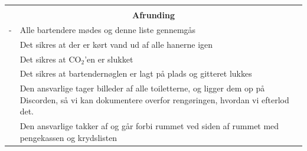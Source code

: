 \documentclass[a4paper,10pt,oneside,article]{memoir}
\begin{document}
\vspace{0.5cm}
\noindent
\begin{tabular}{|l|l|}
    \hline
    \multicolumn{2}{|c|}{} \\
    \multicolumn{2}{|c|}{\Large \textbf{Afrunding}} \\
    \hline
    \begin{minipage}[t]{0.15\textwidth}
        {\color{white}-}
    \end{minipage} & 
    \begin{minipage}[t]{0.80\textwidth}
        Alle bartendere mødes og denne liste gennemgås
    \end{minipage} \\
    \hline
    \begin{minipage}[t]{0.15\textwidth}
    \end{minipage} & 
    \begin{minipage}[t]{0.80\textwidth}
        Det sikres at der er kørt vand ud af alle hanerne igen
    \end{minipage} \\
    \hline
    \begin{minipage}[t]{0.15\textwidth}
    \end{minipage} & 
    \begin{minipage}[t]{0.80\textwidth}
        Det sikres at CO$_2$'en er slukket
    \end{minipage} \\
    \hline
    \begin{minipage}[t]{0.15\textwidth}
    \end{minipage} & 
    \begin{minipage}[t]{0.80\textwidth}
        Det sikres at bartendernøglen er lagt på plads og gitteret lukkes
    \end{minipage} \\
    \hline
    \begin{minipage}[t]{0.15\textwidth}
    \end{minipage} & 
    \begin{minipage}[t]{0.80\textwidth}
        Den ansvarlige tager billeder af alle toiletterne, og ligger dem op
        på Discorden, så vi kan dokumentere overfor rengøringen, hvordan vi 
        efterlod det.
    \end{minipage} \\
    \hline
    \begin{minipage}[t]{0.15\textwidth}
    \end{minipage} & 
    \begin{minipage}[t]{0.80\textwidth}
        Den ansvarlige takker af og går forbi rummet ved siden af rummet med pengekassen og krydslisten
    \end{minipage} \\
    \hline
\end{tabular}

\vfill
\end{document}
